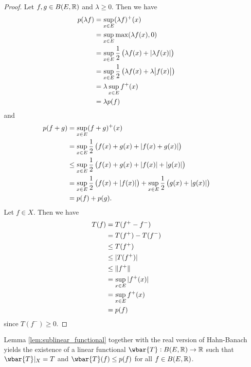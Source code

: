 \begin{enumerate}[label = \textbf{Exercise \arabic*.},wide = 0pt, itemsep = 1.5ex]
		\begin{proof}
			Let $f,g \in B(E,\mathbb{R})$ and $\lambda \geq 0$. Then we have 
			\begin{align*}
				p(\lambda f) &= \sup_{x \in E}(\lambda f)^+(x)\\
				&= \sup_{x \in E}\max(\lambda f(x), 0)\\
				&= \sup_{x \in E} \frac{1}{2}\del[1]{\lambda f(x) + \abs[0]{\lambda f(x)}}\\
				&= \sup_{x \in E} \frac{1}{2}\del[1]{\lambda f(x) + \lambda \abs{f(x)}}\\
				&= \lambda \sup_{x \in E} f^+(x)\\
				&= \lambda p(f)
			\end{align*}
			\noindent and
			\begin{align*}
				p(f + g) &= \sup_{x \in E}(f + g)^+(x)\\
				&= \sup_{x \in E} \frac{1}{2}\del[1]{f(x) + g(x) + \abs[0]{f(x) + g(x)}}\\
				&\leq \sup_{x \in E} \frac{1}{2}\del[1]{f(x) + g(x) + \abs[0]{f(x)} + \abs[0]{g(x)}}\\
				&= \sup_{x \in E} \frac{1}{2}\del[1]{f(x) + \abs[0]{f(x)}} + \sup_{x \in E} \frac{1}{2}\del[1]{g(x) + \abs[0]{g(x)}}\\
				&= p(f) + p(g).
			\end{align*}
			Let $f \in X$. Then we have 
			\begin{align*}
				T(f) &= T(f^+ - f^-)\\
				&= T(f^+) - T(f^-)\\
				&\leq T(f^+)\\
				&\leq \abs[0]{T(f^+)}\\
				&\leq \norm[0]{f^+}\\ 
				&= \sup_{x \in E}\abs[0]{f^+(x)}\\
				&= \sup_{x \in E} f^+(x)\\
				&= p(f)
			\end{align*}
			\noindent since $T(f^-) \geq 0$.
		\end{proof}
		Lemma \ref{lem:sublinear_functional} together with the real version of Hahn-Banach yields the existence of a linear functional $\wbar{T} : B(E,\Rbb) \to \Rbb$ such that $\wbar{T}\vert_X = T$ and $\wbar{T}(f) \leq p(f)$ for all $f \in B(E,\mathbb{R})$.


\end{enumerate}
